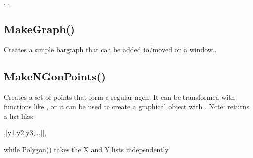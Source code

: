 \documentclass[letterpaper,10pt,english]{sphinxmanual}
\begin{document}
\sphinxAtStartPar
{}, , 

\ignorespaces 

\subsection{MakeGraph()}
\label{\detokenize{reference/graphics:makegraph}}\label{\detokenize{reference/graphics:index-9}}
\sphinxAtStartPar
{}

\sphinxAtStartPar
Creates a simple bargraph that can be added to/moved on a window..

\sphinxAtStartPar
{}

\begin{sphinxVerbatim}[commandchars=\\\{\}]
\end{sphinxVerbatim}

\ignorespaces 

\subsection{MakeNGonPoints()}
\label{\detokenize{reference/graphics:makengonpoints}}\label{\detokenize{reference/graphics:index-10}}
\sphinxAtStartPar
{}

\sphinxAtStartPar
{}

\sphinxAtStartPar
Creates a set of points that form a regular n\sphinxhyphen{}gon.  It can be transformed with functions like , or it can be  used to create a graphical object with .  Note:  returns a list like:

\begin{sphinxVerbatim}[commandchars=\\\{\}]
  [[x1, x2, x3,...],[y1,y2,y3,...]],

while Polygon() takes the X and Y lists independently.
\end{sphinxVerbatim}

\sphinxAtStartPar
{}
\end{document}
